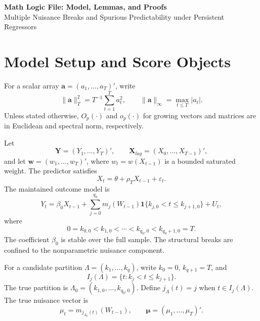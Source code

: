 \documentclass[12pt]{article}
\numberwithin{equation}{section}
\theoremstyle{definition}
\newcommand{\ind}{\mathbf 1}
\begin{document}
\begin{center}
{\Large\bf Math Logic File: Model, Lemmas, and Proofs}\\[6pt]
{\large Multiple Nuisance Breaks and Spurious Predictability under Persistent Regressors}
\end{center}

\section{Model Setup and Score Objects}

For a scalar array \(\bm a=(a_1,\ldots,a_T)'\), write
\[
    \|\bm a\|_T^2
    =
    T^{-1}\sum_{t=1}^T a_t^2,
    \qquad
    \|\bm a\|_\infty=\max_{t\leq T}|a_t|.
\]
Unless stated otherwise, \(O_p(\cdot)\) and \(o_p(\cdot)\) for growing
vectors and matrices are in Euclidean and spectral norm, respectively.

Let
\[
    \bm Y=(Y_1,\ldots,Y_T)',\qquad
    \bm X_{lag}=(X_0,\ldots,X_{T-1})',
\]
and let \(\bm w=(w_1,\ldots,w_T)'\), where \(w_t=w(X_{t-1})\) is a bounded saturated weight. The predictor satisfies
\begin{equation}
    X_t=\theta+\rho_TX_{t-1}+\varepsilon_t.
    \label{eq:predictor}
\end{equation}
The maintained outcome model is
\begin{equation}
    Y_t
    =
    \beta_0X_{t-1}
    +
    \sum_{j=0}^{q_0}
    m_j(W_{t-1})\ind\{k_{j,0}<t\leq k_{j+1,0}\}
    +
    U_t,
    \label{eq:model}
\end{equation}
where
\[
    0=k_{0,0}<k_{1,0}<\cdots<k_{q_0,0}<k_{q_0+1,0}=T.
\]
The coefficient \(\beta_0\) is stable over the full sample. The structural breaks are confined to the nonparametric nuisance component.

For a candidate partition \(\Lambda=(k_1,\ldots,k_q)\), write \(k_0=0\), \(k_{q+1}=T\), and
\[
    I_j(\Lambda)=\{t:k_j<t\leq k_{j+1}\}.
\]
The true partition is \(\Lambda_0=(k_{1,0},\ldots,k_{q_0,0})\). Define \(j_\Lambda(t)=j\) when \(t\in I_j(\Lambda)\). The true nuisance vector is
\[
    \mu_t=m_{j_{\Lambda_0}(t)}(W_{t-1}),
    \qquad
    \bm\mu=(\mu_1,\ldots,\mu_T)'.
\]
\end{document}

